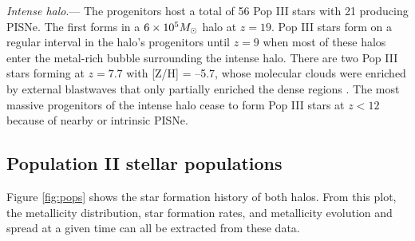 \documentclass[apjl]{emulateapj}
\begin{document}
\textit{Intense halo}.--- The progenitors host a total of 56 Pop III
stars with 21 producing PISNe.  The first forms in a $6 \times 10^5
\Ms$ halo at $z=19$.  Pop III stars form on a regular interval in the
halo's progenitors until $z=9$ when most of these halos enter the
metal-rich bubble surrounding the intense halo.  There are two Pop III
stars forming at $z=7.7$ with [Z/H] = --5.7, whose molecular clouds
were enriched by external blastwaves that only partially enriched the
dense regions \citep{Cen08}.  The most massive progenitors of the
intense halo cease to form Pop III stars at $z<12$ because of nearby
or intrinsic PISNe.

\subsection{Population II stellar populations}
\label{sec:pop}

\begin{figure*}
  \caption{\label{fig:pops} The scatter plots show the star formation
    history of the quiet (left) and intense (right) halos as a
    function of metallicity at $z=7$.  Each circle represents a star
    cluster, whose area is proportional to its mass.  The open circles
    in the upper right represent sizes of $10^3$, $10^4$, and $10^5$
    \Ms~star clusters.  The dashed lines in the right panel guide the
    eye to two stellar populations that were formed in two satellite
    halos, merging at $z=7.5$.  The upper histogram collects the star
    formation history into 25 equal temporal bins.  The right
    histogram depicts the stellar metallicity distribution.}
\end{figure*}


Figure \ref{fig:pops} shows the star formation history of both halos.
From this plot, the metallicity distribution, star formation rates,
and metallicity evolution and spread at a given time can all be
extracted from these data.
\end{document}
